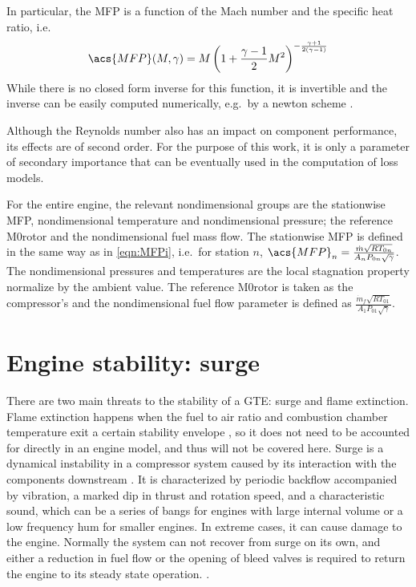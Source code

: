 \documentclass[tcc]{subfiles}
\begin{document}
In particular, the \acl{MFP} is a function of the Mach number and the specific heat ratio,
 i.e.\
\begin{equation}
    \label{eqn:mfp2mach}
    \acs{MFP}(M,\gamma) = M \left( 1 + \frac{\gamma-1}{2}M^2\right)^{-\frac{\gamma+1}{2(\gamma-1)}}
\end{equation}
While there is no closed form inverse for this function, it is invertible and the inverse can be easily computed numerically, e.g.\ by a newton scheme \cite{Der1974}.

Although the Reynolds number also has an impact on component performance, 
its effects are of second order\cite{walsh2004gas}. 
For the purpose of this work, it is only a parameter of secondary importance 
that can be eventually used in the computation of loss models.

For the entire engine, the relevant nondimensional groups are the stationwise
\acl{MFP}, nondimensional temperature and nondimensional pressure;
the reference \acl{M0rotor} and the nondimensional fuel mass flow. 
The stationwise \acl{MFP} is defined in the same way as in \cref{eqn:MFPi}, 
i.e.\ for station $n$, $\acs{MFP}_n = \MFP{n}$. 
The nondimensional pressures and temperatures are the local stagnation property normalize by the ambient value. The reference \acl{M0rotor} is taken as the compressor's 
and the nondimensional fuel flow parameter is defined as 
$\frac{\dot{m}_f \sqrt{RT_{01}}}{A_1 P_{01} \sqrt{\gamma}}$.

\section{Engine stability: surge}
\label{sec:review:surge}

There are two main threats to the stability of a \ac{GTE}: surge and flame extinction.
Flame extinction happens when the fuel to air ratio and combustion chamber temperature 
exit a certain stability envelope \cite{Mattingly1996}, 
so it does not need to be accounted for directly in an engine model, and thus will not be covered here.
Surge is a dynamical instability in a compressor system caused by its interaction with the components downstream \cite{Sparks1983}. 
It is characterized by periodic backflow accompanied by vibration, a marked dip in thrust and rotation speed, and a characteristic sound, 
which can be a series of bangs for engines with large internal volume or a low frequency hum for smaller engines.
In extreme cases, it can cause damage to the engine. 
Normally the system can not recover from surge on its own, 
and either a reduction in fuel flow or the opening of bleed valves is required to return the engine to its steady state operation.
\cite{Willems1999}.
\end{document}
